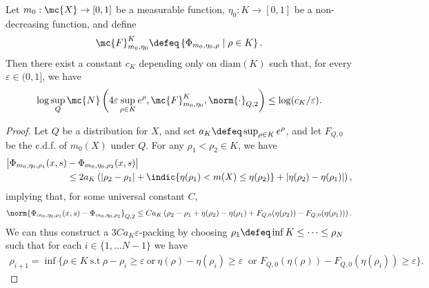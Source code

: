 \begin{lemma}
\label{lem:uniform-covering-number}
Let $m_0 : \mc{X} \to [0,1]$ be a measurable function,  $\eta_0: K \to [0,1]$ be a non-decreasing function, and define
\begin{align*}
\mc{F}_{m_0, \eta_0}^K \defeq \left\{ \Phi_{m_0,  \eta_0, \rho} \mid \rho \in K \right\}.
\end{align*}
Then there exist a constant $c_K$ depending only on $\text{diam}(K)$ such that, for every $\varepsilon \in (0,1]$, we have
\begin{align*}
\log \sup_Q \mc{N} \left(4 \varepsilon \sup_{\rho \in K} e^{\rho},  \mc{F}_{m_0,\eta_0}^K, \norm{\cdot}_{Q,2} \right) \le \log(c_K/\varepsilon).
\end{align*}
\end{lemma}
\begin{proof}
Let $Q$ be a distribution for $X$, and set $a_K \defeq \sup_{\rho \in K} e^\rho$, and let $F_{Q,0}$ be the c.d.f. of $m_0(X)$ under $Q$.
For any $\rho_1< \rho_2 \in K$, we have
\begin{align*}
\big| \Phi_{m_0,  \eta_0, \rho_1}(x,s) &- \Phi_{m_0,  \eta_0, \rho_2}(x,s)\big| \\
&\le 2 a_K \left( \left| \rho_2 - \rho_1 \right| + \indic{ \eta(\rho_1) < m(X) \le \eta(\rho_2)} + \left| \eta(\rho_2) - \eta(\rho_1) \right| \right),
\end{align*}
implying that, for some universal constant $C$, 
\begin{align*}
\norm{\Phi_{m_0,  \eta_0, \rho_1}(x,s) - \Phi_{m_0,  \eta_0, \rho_2}}_{Q,2} \le C a_K \left( \rho_2 - \rho_1 + \eta(\rho_2) - \eta(\rho_1) + F_{Q,0}(\eta(\rho_2)) - F_{Q,0}(\eta(\rho_1)) \right).
\end{align*}
We can thus construct a $3C a_K \varepsilon$-packing by choosing $\rho_1 \defeq \inf K \le \dots \le \rho_N$ such that for each $i \in \{1, \dots N-1\}$ we have
\begin{align*}
\rho_{i+1} = \inf \biggr\{ \rho \in K ~ \text{s.t} ~  \rho - \rho_{i} \ge \varepsilon ~\text{or} ~ \eta(\rho) - \eta(\rho_i)\ge \varepsilon  ~ \text{ or } F_{Q,0}(\eta(\rho)) - F_{Q,0}(\eta(\rho_i)) \ge \varepsilon \biggr\}.
\end{align*}


\end{proof}
